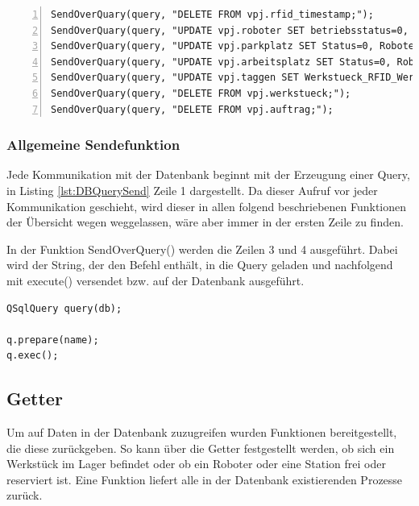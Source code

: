 \begin{lstlisting}[frame=single, breaklines=true, numbers=left, stepnumber=2, firstnumber=1, numberstyle = \tiny, caption=Databank-Handler Initialisierung ,label=lst:DBInit]
SendOverQuary(query, "DELETE FROM vpj.rfid_timestamp;");
SendOverQuary(query, "UPDATE vpj.roboter SET betriebsstatus=0, Werkstueck_RFID_Werkstueck=NULL;");
SendOverQuary(query, "UPDATE vpj.parkplatz SET Status=0, Roboter_id_Roboter=NULL;");
SendOverQuary(query, "UPDATE vpj.arbeitsplatz SET Status=0, Roboter_id_Roboter=NULL, Werkstueck_RFID_Werkstueck=NULL;");
SendOverQuary(query, "UPDATE vpj.taggen SET Werkstueck_RFID_Werkstueck=NULL WHERE id_taggen=1;");
SendOverQuary(query, "DELETE FROM vpj.werkstueck;");
SendOverQuary(query, "DELETE FROM vpj.auftrag;");
\end{lstlisting}

\subsubsection{Allgemeine Sendefunktion}

Jede Kommunikation mit der Datenbank beginnt mit der Erzeugung einer Query, in Listing \ref{lst:DBQuerySend} Zeile 1 dargestellt. Da dieser Aufruf vor jeder Kommunikation geschieht, wird dieser in allen folgend beschriebenen Funktionen der Übersicht wegen weggelassen, wäre aber immer in der ersten Zeile zu finden.

In der Funktion SendOverQuery() werden die Zeilen 3 und 4 ausgeführt. Dabei wird der String, der den Befehl enthält, in die Query geladen und nachfolgend mit execute() versendet bzw. auf der Datenbank ausgeführt. 

\begin{lstlisting}[frame=single, breaklines=true, caption=Databank-Handler Senden über Query ,label=lst:DBQuerySend]
QSqlQuery query(db);

q.prepare(name);
q.exec();
\end{lstlisting}

\subsection{Getter}

Um auf Daten in der Datenbank zuzugreifen wurden Funktionen bereitgestellt, die diese zurückgeben. So kann über die Getter festgestellt werden, ob sich ein Werkstück im Lager befindet oder ob ein Roboter oder eine Station frei oder reserviert ist. Eine Funktion liefert alle in der Datenbank existierenden Prozesse zurück. 

